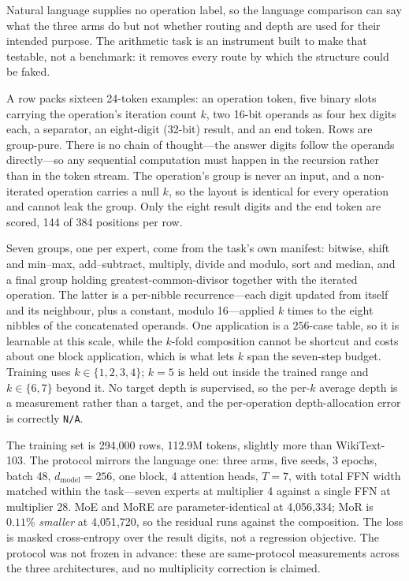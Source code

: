 Natural language supplies no operation label, so the language comparison can say
what the three arms do but not whether routing and depth are used for their
intended purpose. The arithmetic task is an instrument built to make that
testable, not a benchmark: it removes every route by which the structure could be
faked.

A row packs sixteen 24-token examples: an operation token, five binary slots
carrying the operation's iteration count $k$, two 16-bit operands as four hex
digits each, a separator, an eight-digit (32-bit) result, and an end token. Rows
are group-pure. There is no chain of thought---the answer digits follow the
operands directly---so any sequential computation must happen in the recursion
rather than in the token stream. The operation's group is never an input, and a
non-iterated operation carries a null $k$, so the layout is identical for every
operation and cannot leak the group. Only the eight result digits and the end
token are scored, 144 of 384 positions per row.

Seven groups, one per expert, come from the task's own manifest: bitwise, shift
and min--max, add--subtract, multiply, divide and modulo, sort and median, and a
final group holding greatest-common-divisor together with the iterated operation.
The latter is a per-nibble recurrence---each digit updated from itself and its
neighbour, plus a constant, modulo 16---applied $k$ times to the eight nibbles of
the concatenated operands. One application is a $256$-case table, so it is
learnable at this scale, while the $k$-fold composition cannot be shortcut and
costs about one block application, which is what lets $k$ span the seven-step
budget. Training uses $k \in \{1,2,3,4\}$; $k = 5$ is held out inside the trained
range and $k \in \{6,7\}$ beyond it. No target depth is supervised, so the per-$k$
average depth is a measurement rather than a target, and the per-operation
depth-allocation error is correctly \texttt{N/A}.

The training set is 294{,}000 rows, 112.9M tokens, slightly more than
WikiText-103. The protocol mirrors the language one: three arms, five seeds,
3 epochs, batch 48, $d_{\text{model}} = 256$, one block, 4 attention heads,
$T = 7$, with total FFN width matched within the task---seven experts at
multiplier 4 against a single FFN at multiplier 28. MoE and MoRE are
parameter-identical at 4{,}056{,}334; MoR is $0.11\%$ \emph{smaller} at
4{,}051{,}720, so the residual runs against the composition. The loss is masked
cross-entropy over the result digits, not a regression objective. The protocol
was not frozen in advance: these are same-protocol measurements across the three
architectures, and no multiplicity correction is claimed.

